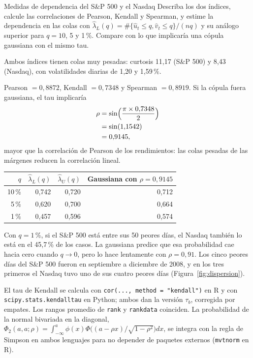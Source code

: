 \begin{ejresuelto}{Medidas de dependencia del S\&P 500 y el Nasdaq}\label{ej:medidas}
\enunciado Describa los dos índices, calcule las correlaciones de Pearson, Kendall y Spearman, y estime la dependencia en las
colas con $\hat\lambda_L(q)=\#\{\hat u_t\le q,\hat v_t\le q\}/(nq)$ y su análogo superior para $q=10$, 5 y 1\,\%. Compare con lo
que implicaría una cópula gaussiana con el mismo tau.

\solucion
{} Ambos índices tienen colas muy pesadas: curtosis 11,17 (S\&P 500) y 8,43 (Nasdaq), con volatilidades
diarias de 1,20 y 1,59\,\%.

 Pearson $=0{,}8872$, Kendall $=0{,}7348$ y Spearman $=0{,}8919$. Si la cópula fuera gaussiana, el tau
implicaría
\begin{align*}
  \rho &= \sin\Bigl(\frac{\pi\times0{,}7348}{2}\Bigr)\\
       &= \sin(1{,}1542)\\
       &= 0{,}9145,
\end{align*}
mayor que la correlación de Pearson de los rendimientos: las colas pesadas de las márgenes reducen la correlación lineal.

\begin{center}\small
\begin{tabular}{@{}rrrr@{}}
\toprule
$q$ & $\hat\lambda_L(q)$ & $\hat\lambda_U(q)$ & Gaussiana con $\rho=0{,}9145$ \\
\midrule
10\,\% & 0,742 & 0,720 & 0,712 \\
5\,\% & 0,620 & 0,700 & 0,664 \\
1\,\% & 0,457 & 0,596 & 0,574 \\
\bottomrule
\end{tabular}
\end{center}
Con $q=1$\,\%, si el S\&P 500 está entre sus 50 peores días, el Nasdaq también lo está en el 45,7\,\% de los casos. La
gaussiana predice que esa probabilidad cae hacia cero cuando $q\to0$, pero lo hace lentamente con $\rho=0{,}91$. Los cinco peores
días del S\&P 500 fueron en septiembre a diciembre de 2008, y en los tres primeros el Nasdaq tuvo uno de sus cuatro peores días
(Figura~\ref{fig:dispersion}).


\RvsPy El tau de Kendall se calcula con \texttt{cor(..., method = "kendall")} en R y con \texttt{scipy.stats.kendalltau} en
Python; ambos dan la versión $\tau_b$, corregida por empates. Los rangos promedio de \texttt{rank} y \texttt{rankdata}
coinciden. La probabilidad de la normal bivariada en la diagonal, $\Phi_2(a,a;\rho)=\int_{-\infty}^a\phi(x)\Phi\bigl((a-\rho
x)/\sqrt{1-\rho^2}\bigr)dx$, se integra con la regla de Simpson en ambos lenguajes para no depender de paquetes externos
(\texttt{mvtnorm} en R).


\end{ejresuelto}
